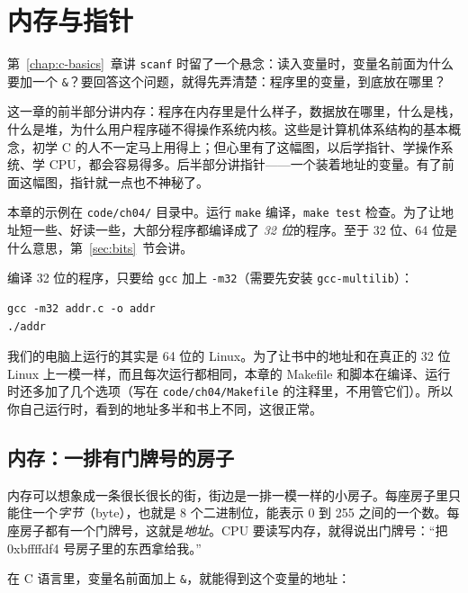 \chapter{内存与指针}
\label{chap:memory}

第~\ref{chap:c-basics}~章讲 \texttt{scanf} 时留了一个悬念：读入变量时，变量名前面为什么要加一个 \texttt{\&}？要回答这个问题，就得先弄清楚：程序里的变量，到底放在哪里？

这一章的前半部分讲内存：程序在内存里是什么样子，数据放在哪里，什么是栈，什么是堆，为什么用户程序碰不得操作系统内核。这些是计算机体系结构的基本概念，初学 C 的人不一定马上用得上；但心里有了这幅图，以后学指针、学操作系统、学 CPU，都会容易得多。后半部分讲指针——一个装着地址的变量。有了前面这幅图，指针就一点也不神秘了。

本章的示例在 \texttt{code/ch04/} 目录中。运行 \texttt{make} 编译，\texttt{make test} 检查。为了让地址短一些、好读一些，大部分程序都编译成了 \emph{32 位}的程序。至于 32 位、64 位是什么意思，第~\ref{sec:bits}~节会讲。

编译 32 位的程序，只要给 \texttt{gcc} 加上 \texttt{-m32}（需要先安装 \texttt{gcc-multilib}）：
\begin{verbatim}
gcc -m32 addr.c -o addr
./addr
\end{verbatim}
我们的电脑上运行的其实是 64 位的 Linux。为了让书中的地址和在真正的 32 位 Linux 上一模一样，而且每次运行都相同，本章的 Makefile 和脚本在编译、运行时还多加了几个选项（写在 \texttt{code/ch04/Makefile} 的注释里，不用管它们）。所以你自己运行时，看到的地址多半和书上不同，这很正常。

\section{内存：一排有门牌号的房子}
\label{sec:mem-street}

内存可以想象成一条很长很长的街，街边是一排一模一样的小房子。每座房子里只能住一个\emph{字节}（byte），也就是 8 个二进制位，能表示 0 到 255 之间的一个数。每座房子都有一个门牌号，这就是\emph{地址}。CPU 要读写内存，就得说出门牌号：“把 0xbffffdf4 号房子里的东西拿给我。”

在 C 语言里，变量名前面加上 \texttt{\&}，就能得到这个变量的地址：


\inputminted[linenos=false]{text}{code/ch04/out/addr.txt}

